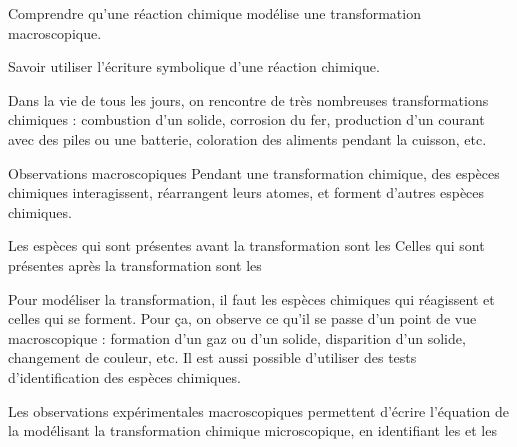 \teteSndChim


\begin{objectifs}
  \item Comprendre qu'une réaction chimique modélise une transformation macroscopique.
  \item Savoir utiliser l'écriture symbolique d'une réaction chimique.
\end{objectifs}

\begin{contexte}
  Dans la vie de tous les jours, on rencontre de très nombreuses transformations chimiques : combustion d'un solide, corrosion du fer, production d'un courant avec des piles ou une batterie, coloration des aliments pendant la cuisson, etc.
  
\end{contexte}


\begin{doc}{Observations macroscopiques}
  Pendant une transformation chimique, des espèces chimiques interagissent, réarrangent leurs atomes, et forment d'autres espèces chimiques.

  \begin{importants}  
    Les espèces qui sont présentes avant la transformation sont les 
    Celles qui sont présentes après la transformation sont les 
  \end{importants}
  
  Pour modéliser la transformation, il faut  les espèces chimiques qui réagissent et celles qui se forment.
  Pour ça, on observe ce qu'il se passe d'un point de vue macroscopique : formation d'un gaz ou d'un solide, disparition d'un solide, changement de couleur, etc.
  Il est aussi possible d'utiliser des tests d'identification des espèces chimiques.
  
  \begin{importants}
    Les observations expérimentales macroscopiques permettent d'écrire l'équation de la  modélisant la transformation chimique microscopique, en identifiant les  et les 
  \end{importants}
\end{doc}

